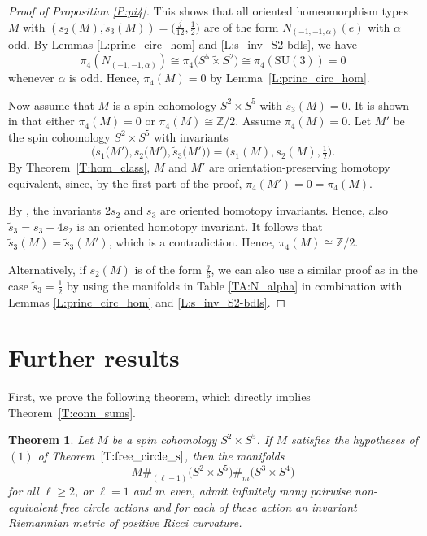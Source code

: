 \documentclass[pdftex]{sigma}
\numberwithin{equation}{section}
\newtheorem{Theorem}{Theorem}[section]
\theoremstyle{definition}
\numberwithin{table}{section}
\newcommand{\Z}{\mathbb{Z}}
\newcommand{\ttimes}{\mathrel{\widetilde{\times} }}
\begin{document}
\begin{proof}[Proof of Proposition \ref{P:pi4}]
	
	
	This shows that all oriented homeomorphism types $M$ with $(s_2(M),\tilde{s}_3(M))=\bigl(\frac{j}{12},\frac{1}{2}\bigr)$ are of the form $N_{(-1,-1,\alpha)}(e)$ with $\alpha$ odd. By Lemmas \ref{L:princ_circ_hom} and \ref{L:s_inv_S2-bdls}, we have \[\pi_4(N_{(-1,-1,\alpha)})\cong \pi_4\bigl(S^5\ttimes S^2\bigr)\cong \pi_4(\mathrm{SU}(3))=0\] whenever $\alpha$ is odd. Hence, $\pi_4(M)=0$ by Lemma~\ref{L:princ_circ_hom}.
	
	Now assume that $M$ is a spin cohomology $S^2\times S^5$ with $\tilde{s}_3(M)=0$. It is shown in \cite[p. 471]{Kr98} that either $\pi_4(M)=0$ or $\pi_4(M)\cong\Z/2$. Assume $\pi_4(M)=0$. Let $M'$ be the spin cohomology $S^2\times S^5$ with invariants
	\[ \big(s_1\big(M'\big),s_2\big(M'\big),\tilde{s}_3\big(M'\big)\big)=\bigl(s_1(M),s_2(M),\tfrac{1}{2}\bigr). \]
	By Theorem~\ref{T:hom_class}, $M$ and $M'$ are orientation-preserving homotopy equivalent, since, by the first part of the proof, $\pi_4(M')=0=\pi_4(M)$.
	
	By \cite[Corollary 4.3]{EM16}, the invariants $2s_2$ and $s_3$ are oriented homotopy invariants. Hence, also $\tilde{s}_3=s_3-4s_2$ is an oriented homotopy invariant. It follows that $\tilde{s}_3(M)=\tilde{s}_3(M')$, which is a contradiction. Hence, $\pi_4(M)\cong\Z/2$.
	
	Alternatively, if $s_2(M)$ is of the form $\frac{j}{6}$, we can also use a similar proof as in the case $\tilde{s}_3=\frac{1}{2}$ by using the manifolds in Table \ref{TA:N_alpha} in combination with Lemmas \ref{L:princ_circ_hom} and \ref{L:s_inv_S2-bdls}.
\end{proof}

\section{Further results}\label{S:further}

First, we prove the following theorem, which directly implies Theorem~\ref{T:conn_sums}.
\begin{Theorem}\label{T:conn_sums_s}
	Let $M$ be a spin cohomology $S^2\times S^5$. If $M$ satisfies the hypotheses of $(1)$ of Theorem~$\ref{T:free_circle_s}$, then the manifolds
	\[ M\#_{(\ell-1)}\bigl(S^2\times S^5\bigr)\#_m\bigl(S^3\times S^4\bigr) \]
	for all $\ell\geq 2$, or $\ell=1$ and $m$ even, admit infinitely many pairwise non-equivalent free circle actions and for each of these action an invariant Riemannian metric of positive Ricci curvature.
\end{Theorem}
\end{document}
